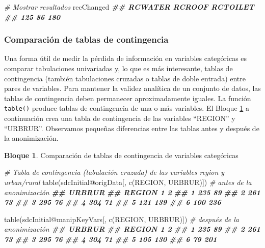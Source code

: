 \documentclass[
]{book}
\newenvironment{Shaded}{\begin{snugshade}}{\end{snugshade}}
\newcommand{\CommentTok}[1]{\textcolor[rgb]{0.56,0.35,0.01}{\textit{#1}}}
\newcommand{\DocumentationTok}[1]{\textcolor[rgb]{0.56,0.35,0.01}{\textbf{\textit{#1}}}}
\newcommand{\FunctionTok}[1]{\textcolor[rgb]{0.00,0.00,0.00}{#1}}
\newcommand{\NormalTok}[1]{#1}
\newcommand{\SpecialCharTok}[1]{\textcolor[rgb]{0.00,0.00,0.00}{#1}}
\newcommand{\StringTok}[1]{\textcolor[rgb]{0.31,0.60,0.02}{#1}}
\theoremstyle{definition}
\theoremstyle{definition}
\newtheorem{example}{Bloque}[chapter]
\theoremstyle{definition}
\theoremstyle{definition}
\theoremstyle{remark}
\begin{document}
\begin{Shaded}
\begin{Highlighting}[]
\CommentTok{\# Mostrar resultados}
\NormalTok{recChanged}
\DocumentationTok{\#\#  RCWATER   RCROOF RCTOILET}
\DocumentationTok{\#\#      125       86      180}
\end{Highlighting}
\end{Shaded}

\hypertarget{comparaciuxf3n-de-tablas-de-contingencia}{%
\subsubsection{Comparación de tablas de contingencia}\label{comparaciuxf3n-de-tablas-de-contingencia}}

Una forma útil de medir la pérdida de información en variables categóricas es comparar tabulaciones univariadas y, lo que es más interesante, tablas de contingencia (también tabulaciones cruzadas o tablas de doble entrada) entre pares de variables. Para mantener la validez analítica de un conjunto de datos, las tablas de contingencia
deben permanecer aproximadamente iguales. La función \texttt{table()} produce tablas de contingencia de una o más variables. El Bloque \ref{exm:bloque4lbn} a continuación crea una tabla de contingencia de las variables ``REGION'' y ``URBRUR''. Observamos pequeñas diferencias entre las tablas antes y después de la anonimización.

\begin{example}
\protect\hypertarget{exm:bloque4lbn}{}\label{exm:bloque4lbn}Comparación de tablas de contingencia de variables categóricas
\end{example}

\begin{Shaded}
\begin{Highlighting}[]
\CommentTok{\# Tabla de contingencia (tabulación cruzada) de las variables region y urban/rural}
 \FunctionTok{table}\NormalTok{(sdcInitial}\SpecialCharTok{@}\NormalTok{origData[, }\FunctionTok{c}\NormalTok{(}\StringTok{\textquotesingle{}REGION\textquotesingle{}}\NormalTok{, }\StringTok{\textquotesingle{}URBRUR\textquotesingle{}}\NormalTok{)]) }\CommentTok{\# antes de la anonimización}
 \DocumentationTok{\#\#       URBRUR}
 \DocumentationTok{\#\# REGION   1   2}
 \DocumentationTok{\#\#      1 235  89}
 \DocumentationTok{\#\#      2 261  73}
 \DocumentationTok{\#\#      3 295  76}
 \DocumentationTok{\#\#      4 304  71}
 \DocumentationTok{\#\#      5 121 139}
 \DocumentationTok{\#\#      6 100 236}

 \FunctionTok{table}\NormalTok{(sdcInitial}\SpecialCharTok{@}\NormalTok{manipKeyVars[, }\FunctionTok{c}\NormalTok{(}\StringTok{\textquotesingle{}REGION\textquotesingle{}}\NormalTok{, }\StringTok{\textquotesingle{}URBRUR\textquotesingle{}}\NormalTok{)]) }\CommentTok{\# después de la anonimización}
 \DocumentationTok{\#\#       URBRUR}
 \DocumentationTok{\#\# REGION   1   2}
 \DocumentationTok{\#\#      1 235  89}
 \DocumentationTok{\#\#      2 261  73}
 \DocumentationTok{\#\#      3 295  76}
 \DocumentationTok{\#\#      4 304  71}
 \DocumentationTok{\#\#      5 105 130}
 \DocumentationTok{\#\#      6  79 201}
\end{Highlighting}
\end{Shaded}
\end{document}
